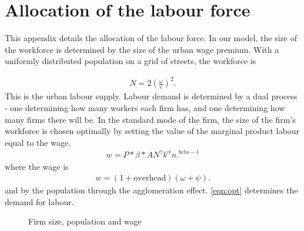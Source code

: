 \chapter{Allocation of the labour force} \label{appendix-Allocation_of_labour}

This appendix details the allocation of the labour force. In our model, the size of the workforce is determined by the size of the urban wage premium. With a uniformly distributed population on a grid of streets, the workforce is
    
\begin{align}\label{eqn:N}
N=2\left(\frac{\omega}{c}\right)^2.    
\end{align}
This is the urban labour supply. Labour demand is determined by a dual process - one determining how many workers each firm has, and one determining how many firms there will be. 
In the standard mode of the firm, the size of the firm's workforce is chosen optimally by setting the value of the marginal product labour equal to the wage.
\begin{align}\label{eqn:opt}
w = P*\beta*AN^\gamma k^\alpha n.^{beta-1}    
\end{align}
where the wage is 
\begin{align}\label{eqn:w}
w=(1 + \text{overhead})(\omega + \psi).
\end{align}
and by the population through the agglomeration effect.  \ref{eqn:opt} determines the demand for labour.

\begin{figure}
    \centering
    \caption{Firm size, population and wage}
    
\label{fig:n_N_w}
\end{figure}

